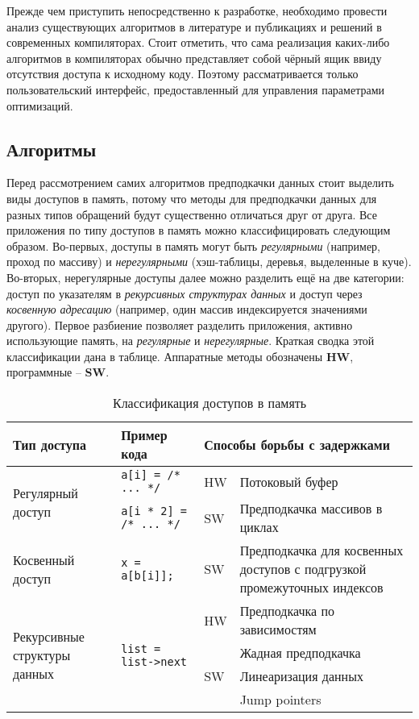 \documentclass[12pt,a4paper]{article}
\begin{document}
\indent

Прежде чем приступить непосредственно к разработке, необходимо провести анализ существующих алгоритмов в литературе и публикациях и решений в современных компиляторах. Стоит отметить, что сама реализация каких-либо алгоритмов в компиляторах обычно представляет собой чёрный ящик ввиду отсутствия доступа к исходному коду. Поэтому рассматривается только пользовательский интерфейс, предоставленный для управления параметрами оптимизаций.

\subsection{Алгоритмы}

\indent

Перед рассмотрением самих алгоритмов предподкачки данных стоит выделить виды доступов в память, потому что методы для предподкачки данных для разных типов обращений будут существенно отличаться друг от друга. Все приложения по типу доступов в память можно классифицировать следующим образом. Во-первых, доступы в память могут быть \emph{регулярными} (например, проход по массиву) и \emph{нерегулярными} (хэш-таблицы, деревья, выделенные в куче). Во-вторых, нерегулярные доступы далее можно разделить ещё на две категории: доступ по указателям в \emph{рекурсивных структурах данных} и доступ через \emph{косвенную адресацию} (например, один массив индексируется значениями другого). Первое разбиение позволяет разделить приложения, активно использующие память, на \emph{регулярные} и \emph{нерегулярные}. Краткая сводка этой классификации дана в таблице. Аппаратные методы обозначены \textbf{HW}, программные -- \textbf{SW}.

\begin{table}[h]
  \begin{center}
    \begin{tabular}{|| m{4cm} | l | l | m{5.5cm} ||}
      \hline
      Тип доступа & Пример кода & \multicolumn{2}{|l|}{Способы борьбы с задержками} \\
      \hline\hline
      \multirow{2}{4cm}{Регулярный доступ} & \texttt{a[i] = /* ... */} & HW & Потоковый буфер \\ \cline{3-4}
                  &  \texttt{a[i * 2] = /* ... */} & SW & Предподкачка массивов в циклах \\
      \hline
      Косвенный доступ & \texttt{x = a[b[i]];} & SW & Предподкачка для косвенных доступов с подгрузкой промежуточных индексов \\
      \hline
      \multirow{4}{4cm}{Рекурсивные структуры данных} & \multirow{4}{*}{\texttt{list = list->next}} & HW & Предподкачка по зависимостям \\ \cline{3-4}
                  & & \multirow{3}{*}{SW} & Жадная предподкачка \\
                  & & & Линеаризация данных \\
                  & & & Jump pointers \\
      \hline
    \end{tabular}
    \caption{Классификация доступов в память}
    \label{tab:classify}
  \end{center}
\end{table}
\end{document}
